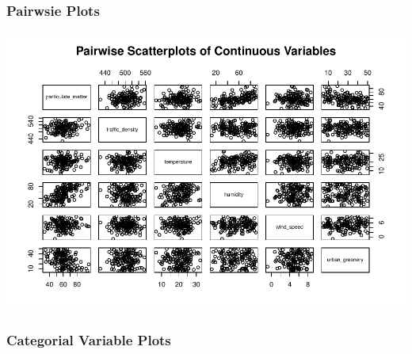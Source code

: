 \documentclass[
]{article}
\begin{document}
\hypertarget{pairwsie-plots}{%
\subsubsection{Pairwsie Plots}\label{pairwsie-plots}}

\includegraphics{Report_files/figure-latex/unnamed-chunk-1-1.pdf}

\hypertarget{categorial-variable-plots}{%
\subsubsection{Categorial Variable
Plots}\label{categorial-variable-plots}}
\end{document}
